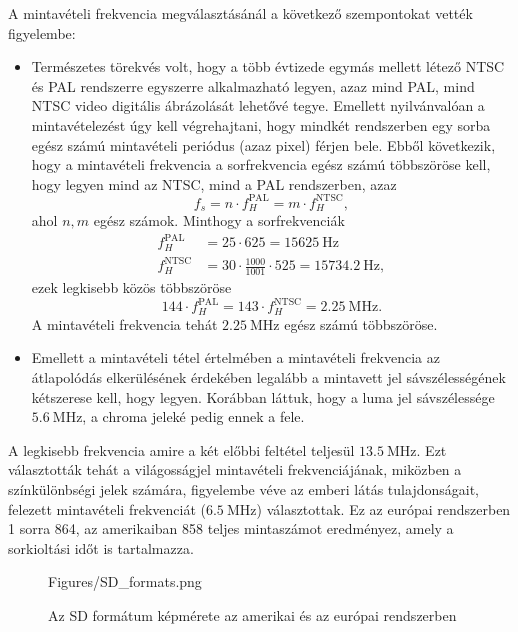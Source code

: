 A mintavételi frekvencia megválasztásánál a következő szempontokat vették figyelembe:
\begin{itemize}
\item Természetes törekvés volt, hogy a több évtizede egymás mellett létező NTSC és PAL rendszerre egyszerre alkalmazható legyen, azaz mind PAL, mind NTSC video digitális ábrázolását lehetővé tegye.
Emellett nyilvánvalóan a mintavételezést úgy kell végrehajtani, hogy mindkét rendszerben egy sorba egész számú mintavételi periódus (azaz pixel) férjen bele.
Ebből következik, hogy a mintavételi frekvencia a sorfrekvencia egész számú többszöröse kell, hogy legyen mind az NTSC, mind a PAL rendszerben, azaz
\begin{equation}
f_s = n \cdot f_H^{\mathrm{PAL}} = m \cdot f_H^{\mathrm{NTSC}},
\end{equation}
ahol $n, m$ egész számok.
Minthogy a sorfrekvenciák 
\begin{align}
f_H^{\mathrm{PAL}} &= 25 \cdot 625 = 15625~\mathrm{Hz} \\
f_H^{\mathrm{NTSC}} &= 30 \cdot \frac{1000}{1001} \cdot 525 = 15734.2~\mathrm{Hz} ,
\end{align}
ezek legkisebb közös többszöröse
\begin{equation}
144 \cdot f_H^{\mathrm{PAL}} = 143 \cdot f_H^{\mathrm{NTSC}} = 2.25~\mathrm{MHz}.
\end{equation}
A mintavételi frekvencia tehát $2.25~\mathrm{MHz}$ egész számú többszöröse.
\item Emellett a mintavételi tétel értelmében a mintavételi frekvencia az átlapolódás elkerülésének érdekében legalább a mintavett jel sávszélességének kétszerese kell, hogy legyen.
Korábban láttuk, hogy a luma jel sávszélessége $5.6~\mathrm{MHz}$, a chroma jeleké pedig ennek a fele.
\end{itemize}
A legkisebb frekvencia amire a két előbbi feltétel teljesül $13.5~\mathrm{MHz}$.
Ezt választották tehát a világosságjel mintavételi frekvenciájának, miközben a színkülönbségi jelek számára, figyelembe véve az emberi látás tulajdonságait, felezett mintavételi frekvenciát ($6.5~\mathrm{MHz}$) választottak.
Ez az európai rendszerben 1 sorra 864, az amerikaiban 858 teljes mintaszámot eredményez, amely a sorkioltási időt is tartalmazza.

\begin{figure}[]
	\centering
	\begin{overpic}[width = 0.65 \columnwidth ]{Figures/SD_formats.png}
	\end{overpic}
	\caption{Az SD formátum képmérete az amerikai és az európai rendszerben}
	\label{Fig:SD_format}
\end{figure}

